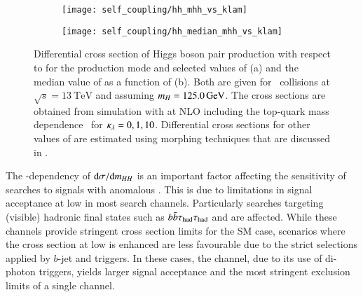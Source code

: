 \begin{figure}[htbp]
  \begin{subfigure}[t]{0.485\textwidth}
    \texttt{[image: self\_coupling/hh\_mhh\_vs\_klam]}
    \subcaption{%
    }%
    \label{fig:hh_xsec_mhh}
  \end{subfigure}\hfill%
  \begin{subfigure}[t]{0.485\textwidth}
    \texttt{[image: self\_coupling/hh\_median\_mhh\_vs\_klam]}
    \subcaption{%
    }%
    \label{fig:hh_median_mhh}
  \end{subfigure}

  \caption{Differential cross section of Higgs boson pair production
    with respect to \mHH for the \ggF production mode and selected
    values of \klambda (a) and the median value of \mHH as a function
    of \klambda (b). Both are given for \pp~collisions at
    $\sqrt{s} = \SI{13}{\TeV}$ and assuming $m_{H} =
    \SI{125.0}{\ensuremath{\text{GeV}}}$. The cross sections are obtained from simulation
    with \POWHEGBOX[v2] at NLO including the top-quark mass
    dependence~\cite{Heinrich:2019bkc,Heinrich:2020ckp} for
    $\kappa_{\lambda} = 0, 1, 10$. Differential cross sections for other
    values of \klambda are estimated using morphing techniques that
    are discussed in .}
  \label{fig:xsec_median_mhh}
\end{figure}

The \klambda-dependency of $\mathrm{d}\sigma / \mathrm{d}m_{HH}$ is an important
factor affecting the sensitivity of searches to signals with anomalous
\klambda. This is due to limitations in signal acceptance at low \mHH in most
search channels.
Particularly searches targeting (visible) hadronic final states such as
$b\bar{b}\tau_{\text{had}}\tau_{\text{had}}$ and \bbbb are affected. While these channels provide stringent
cross section limits for the SM case, scenarios where the cross section at low
\mHH is enhanced are less favourable due to the strict selections applied by
$b$-jet and \tauhadvis triggers. In these cases, the \bbyy channel, due to its
use of di-photon triggers, yields larger signal acceptance and the most
stringent exclusion limits of a single channel.


